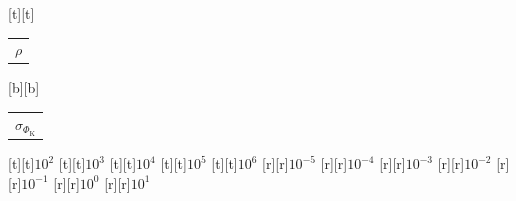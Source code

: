 %    
%
%
\begin{psfrags}%
\psfragscanon%
%
[t][t]{\color[rgb]{0,0,0}\setlength{\tabcolsep}{0pt}\begin{tabular}{c}{\Large$\rho$}\end{tabular}}%
[b][b]{\color[rgb]{0,0,0}\setlength{\tabcolsep}{0pt}\begin{tabular}{c}{\Large$\sigma_{\Phi_\mathrm{K}}$}\end{tabular}}%
%
[t][t]{$10^{2}$}%
[t][t]{$10^{3}$}%
[t][t]{$10^{4}$}%
[t][t]{$10^{5}$}%
[t][t]{$10^{6}$}%
%
[r][r]{$10^{-5}$}%
[r][r]{$10^{-4}$}%
[r][r]{$10^{-3}$}%
[r][r]{$10^{-2}$}%
[r][r]{$10^{-1}$}%
[r][r]{$10^{0}$}%
[r][r]{$10^{1}$}%
%
%
\end{psfrags}%
%
